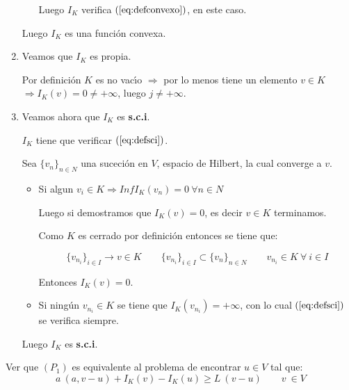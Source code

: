 \begin{demosejer}
\begin{enumerate}
\begin{itemize}
Luego $I_K$ verifica $(\ref{eq:defconvexo})$, en este caso.
\end{itemize}

Luego $I_K$ es una funci\'on convexa.

\item Veamos que $I_K$ es propia.\newline

Por definici\'on $K$ es no vac\'{\i}o $\Longrightarrow $ por lo menos tiene un
elemento $v \in K$ $\Longrightarrow I_K(v) = 0 \neq +\infty $, luego
$j \ne +\infty $. 

\item Veamos ahora que $I_K$ es \textbf{s.c.i}.\newline

$I_K$ tiene que verificar $(\ref{eq:defsci})$.\newline

Sea $\{ v_n \}_{n \in N}$ una suceci\'on en $V$, espacio de Hilbert, la
cual converge a $v$.

\begin{itemize}
\item Si algun $v_i \in K \Longrightarrow Inf I_K(v_n) = 0 \ \forall n \in N$

Luego si demostramos que $I_K(v)=0$, es decir $v \in K$ terminamos.\newline

Como $K$ es cerrado por definici\'on entonces se tiene que:

\begin{displaymath}
\{ v_{n_i} \}_{i \in I} \to v \in K \qquad \{ v_{n_i} \}_{i \in I} \subset
\{ v_n \}_{n \in N} \qquad v_{n_i} \in K \ \forall \ i \in I
\end{displaymath}

Entonces $I_K(v) = 0$.

\item Si ning\'un $v_{n_i} \in K$ se tiene que $I_K(v_{n_i}) = +\infty$, con
lo cual $(\ref{eq:defsci})$ se verifica siempre.
\end{itemize}

Luego $I_K$ es \textbf{s.c.i}.
\end{enumerate}
\end{demosejer}

\begin{ejercicio}
Ver que $(P_1)$ es equivalente al problema de encontrar $u \in V$ tal que:
\begin{displaymath}
a \ ( a , v-u ) + I_K(v) - I_K(u) \ge L\ (v-u) \qquad v \ \in V
\end{displaymath}
\end{ejercicio}


